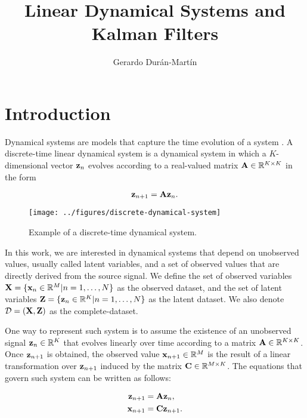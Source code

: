 \documentclass[11pt]{article}
\title{Linear Dynamical Systems and Kalman Filters}
\author{Gerardo Durán-Martín}
\numberwithin{equation}{section}
\newcommand{\x}{{\bf x}}
\newcommand{\X}{{\bf X}}
\newcommand{\z}{{\bf z}}
\newcommand{\Z}{{\bf Z}}
\newcommand{\R}{\mathbb{R}}
\begin{document}
\nocite{*}

\maketitle

\section{Introduction}

Dynamical systems are models that capture the time evolution of a system \cite{strogatz}. A discrete-time linear dynamical system is a dynamical system in which a $K$-dimensional vector $\z_n$ evolves according to a real-valued matrix ${\bf A}\in\R^{K\times K}$ in the form

\begin{equation}
	\z_{n+1} = {\bf A}\z_n.
\end{equation}

\begin{figure}[h!]
	\centering
	\texttt{[image: ../figures/discrete-dynamical-system]}
	\caption{Example of a discrete-time dynamical system.}
	\label{fig:discrete-dynamical-system}
\end{figure}



In this work, we are interested in dynamical systems that depend on unobserved values, usually called latent variables, and a set of observed values that are directly derived from the source signal. We define the set of observed variables $\X = \{\x_n \in \mathbb{R}^M \vert n=1,\ldots, N\}$ as the observed dataset, and the set of latent variables $\Z = \{\z_n \in \mathbb{R}^K \vert n=1,\ldots, N\}$ as the latent dataset. We also denote $\mathcal{D} = ({\bf X}, {\bf Z})$ as the complete-dataset.

One way to represent such system is to assume the existence of an unobserved signal $\z_n \in \mathbb{R}^K$ that evolves linearly over time according to a matrix ${\bf A}\in\mathbb{R}^{K\times K}$. Once $\z_{n+1}$ is obtained, the observed value $\x_{n+1} \in \mathbb{R}^M$ is the result of a linear transformation over $\z_{n+1}$ induced by the matrix ${\bf C}\in \mathbb{R}^{M\times K}$. The equations that govern such system can be written as follows:

\begin{align*}
	\z_{n+1} &= {\bf A} \z_{n},\\
	\x_{n+1} &= {\bf C} \z_{n+1}.
\end{align*}
\end{document}

